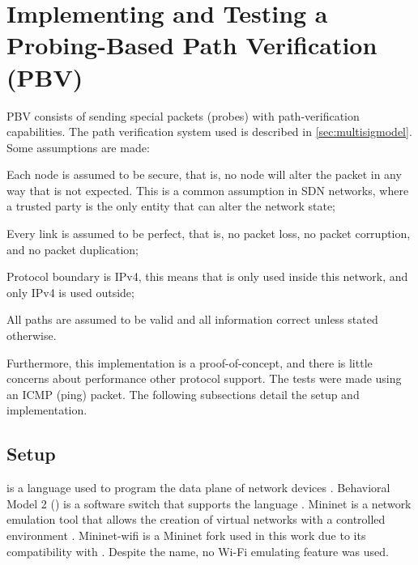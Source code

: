 
\section{Implementing and Testing a Probing-Based Path Verification (PBV)} \label{sec:implementation}

PBV consists of sending special packets (probes) with path-verification capabilities. The path verification system used is described in \autoref{sec:multisigmodel}. Some assumptions are made:
\begin{inlinelist}
    \item Each node is assumed to be secure, that is, no node will alter the packet in any way that is not expected. This is a common assumption in SDN networks, where a trusted party is the only entity that can alter the network state;
    \item  Every link is assumed to be perfect, that is, no packet loss, no packet corruption, and no packet duplication;
    \item  Protocol boundary is IPv4, this means that 
    \pathsec is only used inside this network, and only IPv4 is used outside; \label{assumption:ipv4}
    \item All paths are assumed to be valid and all information correct unless stated otherwise.
\end{inlinelist}
Furthermore, this implementation is a proof-of-concept, and there is little concerns about performance other protocol support. The tests were made using an ICMP (ping) packet. The following subsections detail the setup and implementation.

\subsection{Setup}

\pIV is a language used to program the data plane of network devices \cite{p4}. Behavioral Model 2 (\bmv) is a software switch that supports the \pIV language \cite{bmv2}. Mininet is a network emulation tool that allows the creation of virtual networks with a controlled environment \cite{mininet}. Mininet-wifi\cite{mininet-wifi} is a Mininet fork used in this work due to its compatibility with \bmv. Despite the name, no Wi-Fi emulating feature was used.

